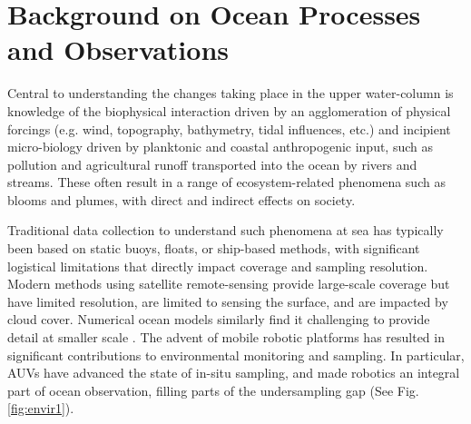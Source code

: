\documentclass[aoas]{imsart}
\begin{document}
\section{Background on Ocean Processes and Observations}\label{sec:bg}

Central to understanding the changes taking place in the upper
water-column is knowledge of the biophysical interaction driven by
an agglomeration of physical forcings (e.g. wind, topography, bathymetry, tidal influences, etc.) and incipient micro-biology driven by planktonic and coastal anthropogenic input, such as pollution and agricultural runoff transported into the ocean by rivers and streams. These often result in a range of ecosystem-related phenomena such as blooms and plumes, with direct and indirect effects on society.

Traditional data collection to understand such phenomena at sea has typically been based on static buoys, floats, or ship-based methods, with significant logistical limitations that directly impact coverage and sampling resolution. Modern methods using satellite remote-sensing provide large-scale coverage but have limited resolution, are limited to sensing the surface, and are impacted by cloud cover. Numerical ocean models similarly find it challenging to provide detail at smaller scale \citep{Lermusiaux:2006}.  The advent of mobile robotic platforms \citep{Bellingham07} has resulted in significant contributions to environmental monitoring and sampling. In particular, AUVs have advanced the state of in-situ sampling, and made robotics an integral part of ocean observation, filling parts of the undersampling gap (See Fig. \ref{fig:envir1}). 

\end{document}
